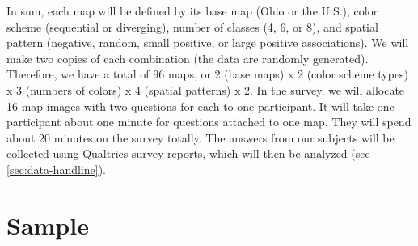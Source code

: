 

In sum, each map will be defined by its base map (Ohio or the U.S.), color scheme (sequential or diverging), number of classes (4, 6, or 8), and spatial pattern (negative, random, small positive, or large positive associations). We will make two copies of each combination (the data are randomly generated). Therefore, we have a total of 96 maps, or 2 (base maps) x 2 (color scheme types) x 3 (numbers of colors) x 4 (spatial patterns) x 2. In the survey, we will allocate 16 map images with two questions for each to one participant. It will take one participant about one minute for questions attached to one map. They will spend about 20 minutes on the survey totally. The answers from our subjects will be collected using Qualtrics survey reports, which will then be analyzed (see \ref{sec:data-handline}).

\section{Sample}

